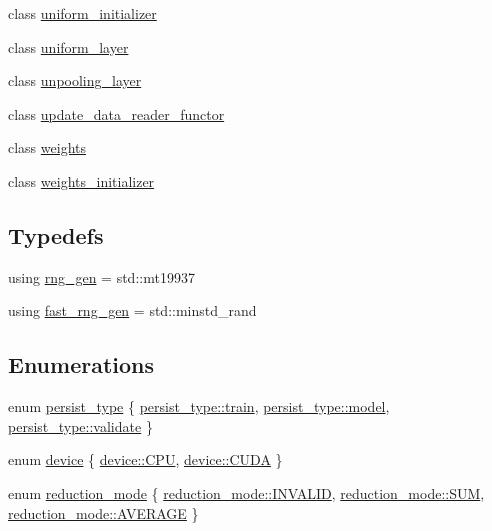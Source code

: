 \begin{DoxyCompactItemize}
\item 
class \hyperlink{classlbann_1_1uniform__initializer}{uniform\+\_\+initializer}
\item 
class \hyperlink{classlbann_1_1uniform__layer}{uniform\+\_\+layer}
\item 
class \hyperlink{classlbann_1_1unpooling__layer}{unpooling\+\_\+layer}
\item 
class \hyperlink{classlbann_1_1update__data__reader__functor}{update\+\_\+data\+\_\+reader\+\_\+functor}
\item 
class \hyperlink{classlbann_1_1weights}{weights}
\item 
class \hyperlink{classlbann_1_1weights__initializer}{weights\+\_\+initializer}
\end{DoxyCompactItemize}
\subsection*{Typedefs}
\begin{DoxyCompactItemize}
\item 
using \hyperlink{namespacelbann_aab7fa584bac85b9085aa8b8c5a888356}{rng\+\_\+gen} = std\+::mt19937
\item 
using \hyperlink{namespacelbann_af16616ffa6a3616836eabadd6ce837ec}{fast\+\_\+rng\+\_\+gen} = std\+::minstd\+\_\+rand
\end{DoxyCompactItemize}
\subsection*{Enumerations}
\begin{DoxyCompactItemize}
\item 
enum \hyperlink{namespacelbann_adee41f31f15f3906cbdcce4a1417eb56}{persist\+\_\+type} \{ \hyperlink{namespacelbann_adee41f31f15f3906cbdcce4a1417eb56a61b3a8faa9c1091806675c230a9abe64}{persist\+\_\+type\+::train}, 
\hyperlink{namespacelbann_adee41f31f15f3906cbdcce4a1417eb56a20f35e630daf44dbfa4c3f68f5399d8c}{persist\+\_\+type\+::model}, 
\hyperlink{namespacelbann_adee41f31f15f3906cbdcce4a1417eb56af9ab05454998236921a6b0e281fae632}{persist\+\_\+type\+::validate}
 \}
\item 
enum \hyperlink{namespacelbann_a3ce21fcce81d74fe54c2f4b5b5b48d9a}{device} \{ \hyperlink{namespacelbann_a3ce21fcce81d74fe54c2f4b5b5b48d9aa2b55387dd066c5bac646ac61543d152d}{device\+::\+C\+PU}, 
\hyperlink{namespacelbann_a3ce21fcce81d74fe54c2f4b5b5b48d9aaa33b7755e5f9b504d2d038eaca4ff28d}{device\+::\+C\+U\+DA}
 \}
\item 
enum \hyperlink{namespacelbann_a5975e1fb530a267728bfb01dc5c1be9b}{reduction\+\_\+mode} \{ \hyperlink{namespacelbann_a5975e1fb530a267728bfb01dc5c1be9baccc0377a8afbf50e7094f5c23a8af223}{reduction\+\_\+mode\+::\+I\+N\+V\+A\+L\+ID}, 
\hyperlink{namespacelbann_a5975e1fb530a267728bfb01dc5c1be9ba6970bdc2201030b9c03fbdcf3973858a}{reduction\+\_\+mode\+::\+S\+UM}, 
\hyperlink{namespacelbann_a5975e1fb530a267728bfb01dc5c1be9ba16de38737a9f8366e9b2042b4e9b6290}{reduction\+\_\+mode\+::\+A\+V\+E\+R\+A\+GE}
 \}
\end{DoxyCompactItemize}
